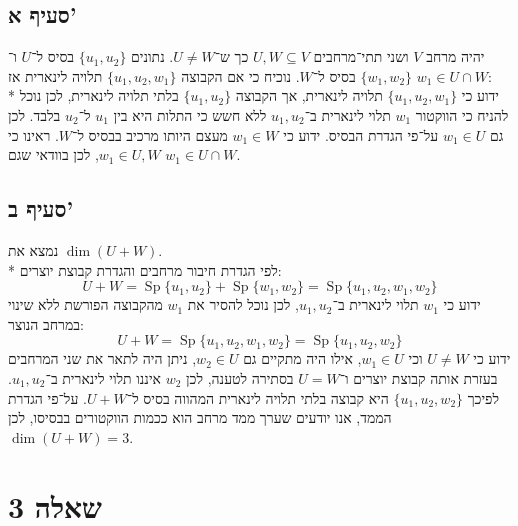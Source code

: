 \documentclass[a4paper]{article}
\DeclareMathOperator\Sp{Sp}
\begin{document}
\subsection{סעיף א'}
יהיה מרחב $V$ ושני תתי־מרחבים $U, W \subseteq V$ כך ש־$U \ne W$.
נתונים $\{u_1, u_2\}$ בסיס ל־$U$ ו־$\{w_1, w_2\}$ בסיס ל־$W$.
נוכיח כי אם הקבוצה $\{u_1, u_2, w_1\}$ תלויה לינארית אז $w_1 \in U \cap W$: \\*
ידוע כי $\{u_1, u_2, w_1\}$ תלויה לינארית,
אך הקבוצה $\{u_1, u_2\}$ בלתי תלויה לינארית,
לכן נוכל להניח כי הווקטור $w_1$ תלוי לינארית ב־$u_1, u_2$
ללא חשש כי התלות היא בין $u_1$ ל־$u_2$ בלבד.
לכן גם $w_1 \in U$ על־פי הגדרת הבסיס.
ידוע כי $w_1 \in W$ מעצם היותו מרכיב בבסיס ל־$W$.
ראינו כי $w_1 \in U, W$, לכן בוודאי שגם $w_1 \in U \cap W$.
\subsection{סעיף ב'}
נמצא את $\dim(U + W)$. \\*
לפי הגדרת חיבור מרחבים והגדרת קבוצת יוצרים:
\[
	U + W
	= \Sp\{ u_1, u_2 \} + \Sp\{ w_1, w_2 \}
	= \Sp\{ u_1, u_2, w_1, w_2 \}
\]
ידוע כי $w_1$ תלוי לינארית ב־$u_1, u_2$,
לכן נוכל להסיר את $w_1$ מהקבוצה הפורשת ללא שינוי במרחב הנוצר:
\[
	U + W
	= \Sp\{ u_1, u_2, w_1, w_2 \}
	= \Sp\{ u_1, u_2, w_2 \}
\]
ידוע כי $U \ne W$ וכי $w_1 \in U$, אילו היה מתקיים גם $w_2 \in U$,
ניתן היה לתאר את שני המרחבים בעזרת אותה קבוצת יוצרים ו־$U = W$
בסתירה לטענה, לכן $w_2$ איננו תלוי לינארית ב־$u_1, u_2$.
לפיכך $\{u_1, u_2, w_2\}$ היא קבוצה בלתי תלויה לינארית המהווה בסיס ל־$U + W$.
על־פי הגדרת הממד, אנו יודעים שערך ממד מרחב הוא ככמות הווקטורים בבסיסו,
לכן $\dim(U + W) = 3$.

\section{שאלה 3}
\end{document}
